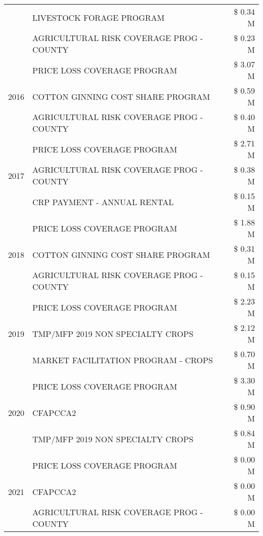 \begin{tabular}{llr}
 & LIVESTOCK FORAGE PROGRAM & \$ 0.34 M \\
 & AGRICULTURAL RISK COVERAGE PROG - COUNTY & \$ 0.23 M \\
\cline{1-3}
\multirow[t]{3}{*}{2016} & PRICE LOSS COVERAGE PROGRAM                   & \$ 3.07 M \\
 & COTTON GINNING COST SHARE PROGRAM             & \$ 0.59 M \\
 & AGRICULTURAL RISK COVERAGE PROG - COUNTY      & \$ 0.40 M \\
\cline{1-3}
\multirow[t]{3}{*}{2017} & PRICE LOSS COVERAGE PROGRAM & \$ 2.71 M \\
 & AGRICULTURAL RISK COVERAGE PROG - COUNTY & \$ 0.38 M \\
 & CRP PAYMENT - ANNUAL RENTAL & \$ 0.15 M \\
\cline{1-3}
\multirow[t]{3}{*}{2018} & PRICE LOSS COVERAGE PROGRAM & \$ 1.88 M \\
 & COTTON GINNING COST SHARE PROGRAM & \$ 0.31 M \\
 & AGRICULTURAL RISK COVERAGE PROG - COUNTY & \$ 0.15 M \\
\cline{1-3}
\multirow[t]{3}{*}{2019} & PRICE LOSS COVERAGE PROGRAM & \$ 2.23 M \\
 & TMP/MFP 2019 NON SPECIALTY CROPS & \$ 2.12 M \\
 & MARKET FACILITATION PROGRAM - CROPS & \$ 0.70 M \\
\cline{1-3}
\multirow[t]{3}{*}{2020} & PRICE LOSS COVERAGE PROGRAM & \$ 3.30 M \\
 & CFAPCCA2 & \$ 0.90 M \\
 & TMP/MFP 2019 NON SPECIALTY CROPS & \$ 0.84 M \\
\cline{1-3}
\multirow[t]{3}{*}{2021} & PRICE LOSS COVERAGE PROGRAM & \$ 0.00 M \\
 & CFAPCCA2 & \$ 0.00 M \\
 & AGRICULTURAL RISK COVERAGE PROG - COUNTY & \$ 0.00 M \\
\cline{1-3}
\bottomrule
\end{tabular}
